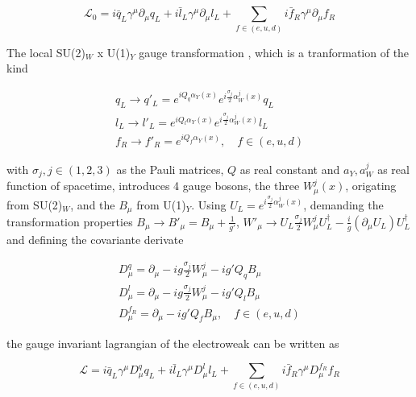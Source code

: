\begin{equation}
	\label{eq:eq_1_5}
	\mathcal{L}_{0} = i\bar{q}_{L}\gamma^{\mu}\partial_{\mu}q_{L} + i\bar{l}_{L}\gamma^{\mu}\partial_{\mu}l_{L} + \sum_{f \in (e, u, d)} i\bar{f}_{R}\gamma^{\mu}\partial_{\mu}f_{R}
\end{equation}

The local SU(2)$_{W}$ x U(1)$_{Y}$ gauge transformation \cite{EWK}, which is a tranformation of the kind

\begin{equation}
	\label{eq:eq_1_6}
	\begin{split}
		q_{L} \rightarrow q'_{L} = e^{iQ_{q} \alpha_{Y}(x)} e^{i\frac{\sigma_{j}}{2}\alpha^{j}_{W}(x)}q_{L} \\
		l_{L} \rightarrow l'_{L} = e^{iQ_{l} \alpha_{Y}(x)} e^{i\frac{\sigma_{j}}{2}\alpha^{j}_{W}(x)}l_{L} \\
		f_{R} \rightarrow f'_{R} = e^{iQ_{f} \alpha_{Y}(x)}, \quad f \in (e, u, d)
	\end{split}			
\end{equation}

with $\sigma_{j}, j \in (1,2,3)$ as the Pauli matrices, $Q$ as real constant and $a_{Y}, a^{j}_{W}$ as real function of spacetime, introduces 4 gauge bosons, the three $W^{j}_{\mu}(x)$, origating from SU(2)$_{W}$, and the $B_{\mu}$ from U(1)$_{Y}$. Using $U_{L} = e^{i\frac{\sigma_{j}}{2}\alpha^{j}_{W}(x)}$, demanding the transformation properties $B_{\mu} \rightarrow B'_{\mu} = B_{\mu} + \frac{1}{g'}$, $W'_{\mu} \rightarrow U_{L}\frac{\sigma_{j}}{2}W_{\mu}^{j}U_{L}^{\dagger} - \frac{i}{g}(\partial_{\mu}U_{L})U_{L}^{\dagger}$ and defining the covariante derivate 

\begin{equation}
	\label{eq:eq_1_7}
	\begin{split}
		D^{q}_{\mu} = \partial_{\mu}  - ig\frac{\sigma_{j}}{2}W^{j}_{\mu} - ig'Q_{q}B_{\mu} \\
		D^{l}_{\mu} = \partial_{\mu}  - ig\frac{\sigma_{j}}{2}W^{j}_{\mu} - ig'Q_{l}B_{\mu} \\
		D^{f_R}_{\mu} = \partial_{\mu}  - ig'Q_{f}B_{\mu}, \quad f \in (e, u, d)
	\end{split}
\end{equation}

the gauge invariant lagrangian of the electroweak can be written as 

\begin{equation}
	\label{eq:eq_1_8}
	\mathcal{L} = i\bar{q}_{L}\gamma^{\mu}D_{\mu}^{q}q_{L} + i\bar{l}_{L}\gamma^{\mu}D_{\mu}^{l}l_{L} + \sum_{f \in (e, u, d)} i\bar{f}_{R}\gamma^{\mu}D^{f_R}_{\mu}f_{R}
\end{equation}


